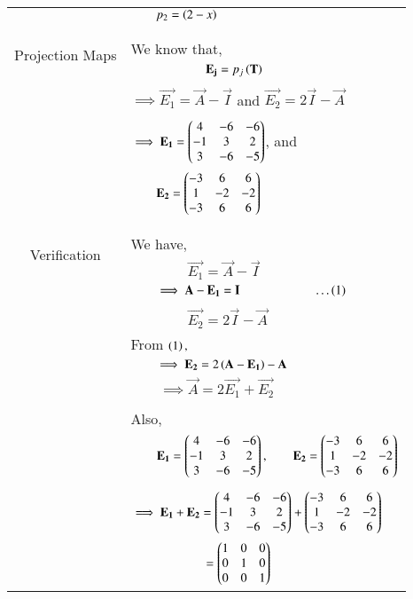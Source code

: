 \documentclass[journal,12pt]{IEEEtran}
\begin{document}
\begin{longtable}{|c|l|}
	&$\qquad p_2=\left(2-x\right)$\\
	&\\
	\hline
	\multirow{3}{*}{Projection Maps} & \\
	& We know that,\\
	&$\qquad \qquad \qquad \mathbf{E_j}=p_j\left(\mathbf{T
	}\right)$\\ 
	&\\
	&$\implies \vec{E_1}=\vec{A}-\vec{I}$ and $\vec{E_2}=2\vec{I}-\vec{A}$ \\
	&\\
	&$\implies \mathbf{E_1}=\begin{pmatrix}4&-6&-6\\-1&3&2\\3&-6&-5\end{pmatrix}$, and \\
	&$\qquad \mathbf{E_2}=\begin{pmatrix}-3&6&6\\1&-2&-2\\-3&6&6\end{pmatrix}$\\
	&\\
	\hline
\multirow{3}{*}{Verification} & \\
	& We have, \\
	&$\qquad\qquad\vec{E_1}=\vec{A}-\vec{I}$\\
	&$\qquad\implies \mathbf{A}-\mathbf{E_1}=\mathbf{I}\qquad\qquad\qquad\dots\left(1\right)$\\
	&\\
	&$\qquad\qquad\vec{E_2}=2\vec{I}-\vec{A}$\\
	&From $\left(1\right),$\\
	&$\qquad\implies\mathbf{E_2}=2\left(\mathbf{A}-\mathbf{E_1}\right)-\mathbf{A}$\\
	&$\qquad\implies \boxed{\vec{A}=2\vec{E_1}+\vec{E_2}}$\\
	&\\
	& Also,\\
	&$\qquad \mathbf{E_1}=\begin{pmatrix}4&-6&-6\\-1&3&2\\3&-6&-5\end{pmatrix},\qquad \mathbf{E_2}=\begin{pmatrix}-3&6&6\\1&-2&-2\\-3&6&6\end{pmatrix}$\\
	&\\
	&$\implies \mathbf{E_1}+\mathbf{E_2}=\begin{pmatrix}4&-6&-6\\-1&3&2\\3&-6&-5\end{pmatrix}+\begin{pmatrix}-3&6&6\\1&-2&-2\\-3&6&6\end{pmatrix}$\\
	&$\qquad\qquad\qquad = \begin{pmatrix}1&0&0\\0&1&0\\0&0&1\end{pmatrix}$\\

\end{longtable}
\end{document}
